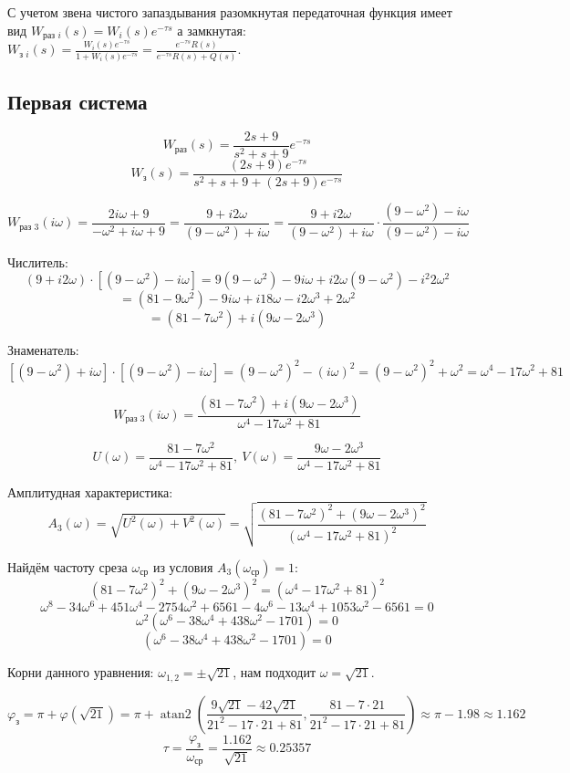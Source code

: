 С учетом звена чистого запаздывания разомкнутая передаточная функция имеет вид $W_{\text{раз }i}(s)=W_i(s)e^{-\tau s}$
а замкнутая: $W_{\text{з }i}(s)=\frac{W_i(s)e^{-\tau s}}{1+W_i(s)e^{-\tau s}}=\frac{e^{-\tau s}R(s)}{e^{-\tau s}R(s)+Q(s)}$.


\subsection{Первая система}

$$W_{\text{раз}}(s)=\frac{2s+9}{s^2+s+9}e^{-\tau s}$$
$$W_{\text{з}}(s)=\frac{(2s+9)e^{-\tau s}}{s^2+s+9+(2s+9)e^{-\tau s}}$$

$$W_{\text{раз 3}}(i\omega) = \frac{2i\omega+9}{-\omega^2+i\omega+9} = \frac{9 + i2\omega}{(9-\omega^2) + i\omega}=\frac{9 + i2\omega}{(9-\omega^2) + i\omega} \cdot \frac{(9-\omega^2) - i\omega}{(9-\omega^2) - i\omega}
$$

Числитель:
$$(9 + i2\omega) \cdot [(9-\omega^2) - i\omega] = 9(9-\omega^2) - 9i\omega + i2\omega(9-\omega^2) - i^2 2\omega^2$$
$$= (81 - 9\omega^2) - 9i\omega + i18\omega - i2\omega^3 + 2\omega^2$$
$$= (81 - 7\omega^2) + i(9\omega - 2\omega^3)$$

Знаменатель:
$$[(9-\omega^2) + i\omega] \cdot [(9-\omega^2) - i\omega] = (9-\omega^2)^2 - (i\omega)^2 = (9-\omega^2)^2 + \omega^2 = \omega^4 - 17\omega^2 + 81$$

$$
W_{\text{раз 3}}(i\omega)=\frac{(81 - 7\omega^2) + i(9\omega - 2\omega^3)}{\omega^4 - 17\omega^2 + 81}$$

$$U(\omega) = \frac{81 - 7\omega^2}{\omega^4 - 17\omega^2 + 81},\ V(\omega) = \frac{9\omega - 2\omega^3}{\omega^4 - 17\omega^2 + 81}$$

Амплитудная характеристика:
$$A_3(\omega) = \sqrt{U^2(\omega) + V^2(\omega)} = \sqrt{\frac{(81-7\omega^2)^2 + (9\omega-2\omega^3)^2}{(\omega^4 - 17\omega^2 + 81)^2}}$$

Найдём частоту среза $\omega_{\text{ср}}$ из условия $A_3(\omega_{\text{ср}}) = 1$:
$$(81-7\omega^2)^2 + (9\omega-2\omega^3)^2 = (\omega^4 - 17\omega^2 + 81)^2$$
$$\omega^8 - 34\omega^6 + 451\omega^4 - 2754\omega^2 + 6561 - 4\omega^6 - 13\omega^4 + 1053\omega^2 - 6561=0$$
$$ \omega^2(\omega^6 - 38\omega^4 + 438\omega^2 - 1701)=0$$
$$ (\omega^6 - 38\omega^4 + 438\omega^2 - 1701)=0$$

Корни данного уравнения: $\omega_{1,2}=\pm\sqrt{21}$, нам подходит $\omega=\sqrt{21}$.
 
$$\varphi_\text{з}=\pi + \varphi(\sqrt{21})=\pi +\operatorname{atan2}\left(\frac{9\sqrt{21} - 42\sqrt{21}}{21^2 - 17\cdot 21 + 81},  \frac{81 - 7\cdot 21}{21^2 - 17\cdot 21 + 81}\right)\approx\pi-1.98\approx1.162$$
$$\tau=\frac{\varphi_\text{з}}{\omega_\text{ср}}=\frac{1.162}{\sqrt{21}}\approx0.25357$$

